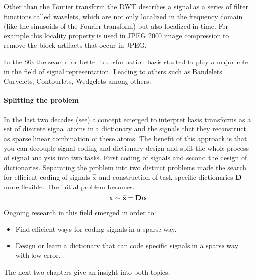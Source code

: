 Other than the Fourier transform the DWT describes a signal as a series of
filter functions called wavelets, which are not only localized in the frequency
domain (like the sinusoids of the Fourier transform) but also localized in
time. 
For example this locality property is used in JPEG 2000 image compression to
remove the block artifacts that occur in JPEG. 

In the 80s the search for better transformation basis started to play a major
role in the field of signal representation. Leading to others such as Bandelets,
Curvelets, Contourlets, Wedgelets among others.

\paragraph{Splitting the problem}
In the last two decades (see\cite{Olshausen1996,Mallat1993}) a concept emerged
to interpret basis transforms as a set of discrete signal atoms in a dictionary
and the signals that they reconstruct as sparse linear combination of these
atoms. The benefit of this approach is that you can decouple signal coding and
dictionary design and split the whole process of signal analysis into two tasks.
First coding of signals and second the design of dictionaries. Separating the
problem into two distinct problems made the search for efficient coding of
signals $\vec{x}$ and construction of task specific dictionaries $\boldsymbol{\mathrm{D}}$ more
flexible. The initial problem becomes:
\begin{equation}
 \boldsymbol{\mathrm{x}} \sim \boldsymbol{\mathrm{\tilde{x}}}  = \boldsymbol{\mathrm{D}}\boldsymbol{\mathrm{\alpha}}
\end{equation}

Ongoing research in this field emerged in order to:
\begin{itemize}
 \item Find efficient ways for coding signals in a sparse way.
 \item Design or learn a dictionary that can code specific signals in
a sparse way with low error.
\end{itemize}
The next two chapters give an insight into both topics. 



